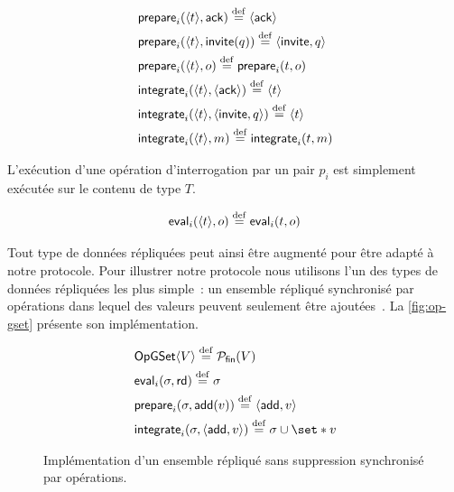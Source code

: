 \begin{align*}
    &\trm{prepare}_i(\tuple*{t}, \trm{ack}) \defeq \tuple*{\trm{ack}}\\
    &\trm{prepare}_i(\tuple*{t}, \trm{invite}(q)) \defeq \tuple*{\trm{invite}, q}\\
    &\trm{prepare}_i(\tuple*{t}, o) \defeq \trm{prepare}_i(t, o)\\
    &\trm{integrate}_i(\tuple*{t}, \tuple*{\trm{ack}}) \defeq \tuple*{t}\\
    &\trm{integrate}_i(\tuple*{t}, \tuple*{\trm{invite}, q}) \defeq \tuple*{t}\\
    &\trm{integrate}_i(\tuple*{t}, m) \defeq \trm{integrate}_i(t, m)
\end{align*}

L'exécution d'une opération d'interrogation par un pair $p_i$ est simplement exécutée sur le contenu de type $T$.

\begin{equation*}
    \trm{eval}_i(\tuple*{t}, o) \defeq \trm{eval}_i(t, o)
\end{equation*}

Tout type de données répliquées peut ainsi être augmenté pour être adapté à notre protocole.
Pour illustrer notre protocole nous utilisons l'un des types de données répliquées les plus simple~: un ensemble répliqué synchronisé par opérations dans lequel des valeurs peuvent seulement être ajoutées~\autocite{baquero_2018_pure-op-crdt}.
La \autoref{fig:op-gset} présente son implémentation.

\begin{figure}[bth]
\centering
\begin{align}
&\trm{OpGSet}\tuple*{V} \defeq \powerfset{V} \label{eq:op-gset-state}\\
&\trm{eval}_i(\sigma, \trm{rd}) \defeq \sigma \label{eq:op-gset-eval}\\
&\trm{prepare}_i(\sigma, \trm{add}(v)) \defeq \tuple*{\trm{add}, v} \label{eq:op-gset-prep-add}\\
&\trm{integrate}_i(\sigma, \tuple*{\trm{add}, v}) \defeq \sigma \cup \set*{v} \label{eq:op-gset-integr-add}
\end{align}
\caption[Implémentation d'un ensemble sans suppression répliqué synchronisé par opérations]{Implémentation d'un ensemble répliqué sans suppression synchronisé par opérations.}\label{fig:op-gset}
\end{figure}


